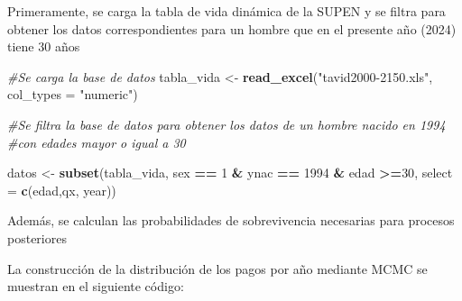 \documentclass[
]{article}
\newenvironment{Shaded}{\begin{snugshade}}{\end{snugshade}}
\newcommand{\AttributeTok}[1]{\textcolor[rgb]{0.13,0.29,0.53}{#1}}
\newcommand{\CommentTok}[1]{\textcolor[rgb]{0.56,0.35,0.01}{\textit{#1}}}
\newcommand{\DecValTok}[1]{\textcolor[rgb]{0.00,0.00,0.81}{#1}}
\newcommand{\FunctionTok}[1]{\textcolor[rgb]{0.13,0.29,0.53}{\textbf{#1}}}
\newcommand{\NormalTok}[1]{#1}
\newcommand{\OtherTok}[1]{\textcolor[rgb]{0.56,0.35,0.01}{#1}}
\newcommand{\SpecialCharTok}[1]{\textcolor[rgb]{0.81,0.36,0.00}{\textbf{#1}}}
\newcommand{\StringTok}[1]{\textcolor[rgb]{0.31,0.60,0.02}{#1}}
\begin{document}
Primeramente, se carga la tabla de vida dinámica de la SUPEN y se filtra
para obtener los datos correspondientes para un hombre que en el
presente año (2024) tiene 30 años

\begin{Shaded}
\begin{Highlighting}[]
\CommentTok{\#Se carga la base de datos}
\NormalTok{tabla\_vida }\OtherTok{\textless{}{-}} \FunctionTok{read\_excel}\NormalTok{(}\StringTok{"tavid2000{-}2150.xls"}\NormalTok{,}
                         \AttributeTok{col\_types =} \StringTok{"numeric"}\NormalTok{)}

\CommentTok{\#Se filtra la base de datos para obtener los datos de un hombre nacido en 1994 }
\CommentTok{\#con edades mayor o igual a 30}

\NormalTok{datos }\OtherTok{\textless{}{-}} \FunctionTok{subset}\NormalTok{(tabla\_vida, sex }\SpecialCharTok{==} \DecValTok{1} \SpecialCharTok{\&}\NormalTok{ ynac }\SpecialCharTok{==} \DecValTok{1994} \SpecialCharTok{\&}\NormalTok{ edad }\SpecialCharTok{\textgreater{}=}\DecValTok{30}\NormalTok{, }\AttributeTok{select =} \FunctionTok{c}\NormalTok{(edad,qx, year))}
\end{Highlighting}
\end{Shaded}

Además, se calculan las probabilidades de sobrevivencia necesarias para
procesos posteriores

\begin{Shaded}
\end{Shaded}

La construcción de la distribución de los pagos por año mediante MCMC se
muestran en el siguiente código:
\end{document}
